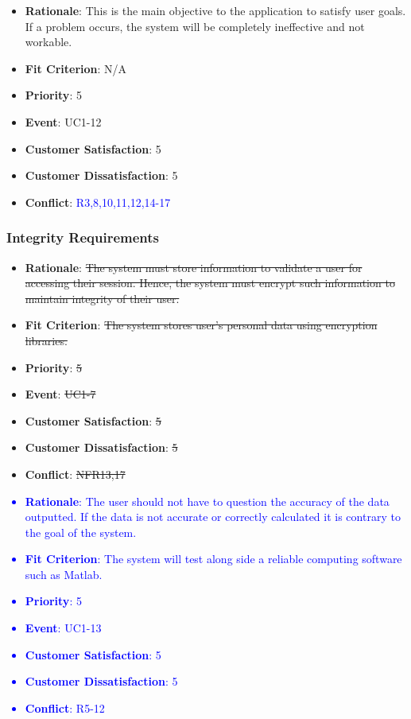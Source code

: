 \documentclass[12pt, titlepage]{article}
\newcounter{reqnum} %
\newcounter{freqnum} %
\begin{document}
\begin{itemize}
{\begin{itemize}
    \item \textbf{Rationale}: This is the main objective to the application to satisfy user goals. If a problem occurs, the system will be completely ineffective and not workable. 
    \item \textbf{Fit Criterion}: N/A
    \item \textbf{Priority}: 5
    \item \textbf{Event}: UC1-12%
    \item \textbf{Customer Satisfaction}: 5
    \item \textbf{Customer Dissatisfaction}: 5
    \item \textbf{Conflict}: \textcolor{blue}{R3,8,10,11,12,14-17}
\end{itemize}
}

\subsubsection{Integrity Requirements}
\item[\sout{NFR19}
\label{NFR}:] 
\begin{itemize}
    \item \textbf{Rationale}: \sout{The system must store information to validate a user for accessing their session. Hence, the system must encrypt such information to maintain integrity of their user.}
    \item \textbf{Fit Criterion}: \sout{The system stores user's personal data using encryption libraries.}
    \item \textbf{Priority}: \sout{5}
    \item \textbf{Event}: \sout{UC1-7}%
    \item \textbf{Customer Satisfaction}: \sout{5}
    \item \textbf{Customer Dissatisfaction}: \sout{5}
    \item \textbf{Conflict}: \sout{NFR13,17}
\end{itemize}
\textcolor{blue}{
\item[NFR\refstepcounter{freqnum}\thefreqnum
\label{NFR}:] 
\begin{itemize}
    \item \textbf{Rationale}: The user should not have to question the accuracy of the data outputted. If the data is not accurate or correctly calculated it is contrary to the goal of the system.
    \item \textbf{Fit Criterion}: The system will test along side a reliable computing software such as Matlab. 
    \item \textbf{Priority}: 5
    \item \textbf{Event}: UC1-13%
    \item \textbf{Customer Satisfaction}: 5
    \item \textbf{Customer Dissatisfaction}: 5
    \item \textbf{Conflict}: \textcolor{blue}{R5-12}
\end{itemize}
}


\end{itemize}
\end{document}
